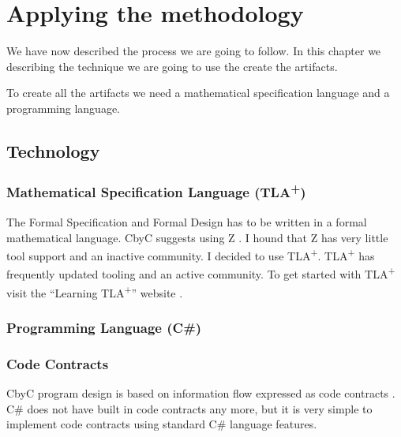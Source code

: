 
\chapter{Applying the methodology} %

\label{Chapter_Applying_the_methodology} %

We have now described the process we are going to follow. In this chapter we
describing the technique we are going to use the create the artifacts.

To create all the artifacts we need a mathematical specification language
and a programming language.

\section{Technology}
\subsection{Mathematical Specification Language (TLA\textsuperscript{+})}
The Formal Specification and Formal Design has to be written in a formal
mathematical language. CbyC suggests using Z  \parencite{CbyCPraxis}. 
I hound that Z has very little tool support and an inactive community. I decided
to use TLA\textsuperscript{+}.  TLA\textsuperscript{+} has frequently updated 
tooling and an active community. To get started with TLA\textsuperscript{+}
visit the ``Learning TLA\textsuperscript{+}'' website \parencite{LearningTLA}.

\subsection{Programming Language (C\#)}

\subsection{Code Contracts}

CbyC program design is based on information flow expressed as code contracts 
\parencite{CbyCMan}. C\# does not have built in code contracts any more, but it
is very simple to implement code contracts using standard C\# language features.


